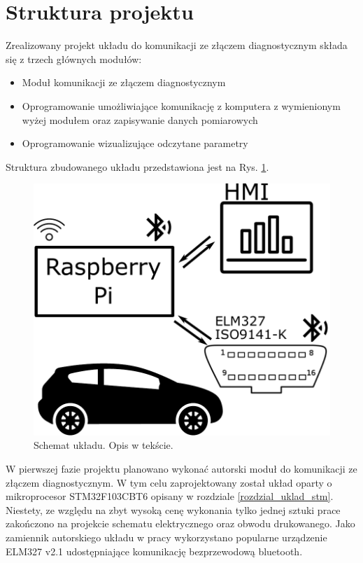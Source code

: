 \documentclass[12pt, twoside]{article} %
\numberwithin{equation}{subsection}
\numberwithin{figure}{section}
\numberwithin{table}{section}
\begin{document}
	\newpage
	
	\section{Struktura projektu}
	\hspace{0.5cm}Zrealizowany projekt układu do komunikacji ze złączem diagnostycznym składa się z trzech głównych modułów:
	
	\begin{itemize}
		\item{Moduł komunikacji ze złączem diagnostycznym}
		\item{Oprogramowanie umożliwiające komunikację z komputera z wymienionym wyżej modułem oraz zapisywanie danych pomiarowych}
		\item{Oprogramowanie wizualizujące odczytane parametry}
	\end{itemize}
	
	Struktura zbudowanego układu przedstawiona jest na Rys. \ref{rys_schemat_ukladu}.
	
		\begin{figure}[ht]
		\centering
		\includegraphics[scale=0.8]{Images/SchematUkladu.pdf}
		\caption{Schemat układu. Opis w tekście.}
		\label{rys_schemat_ukladu}
		\end{figure}
	
	W pierwszej fazie projektu planowano wykonać autorski moduł do komunikacji ze złączem diagnostycznym. W tym celu zaprojektowany został układ oparty o mikroprocesor STM32F103CBT6 opisany w rozdziale \ref{rozdzial_uklad_stm}. Niestety, ze względu na zbyt wysoką cenę wykonania tylko jednej sztuki prace zakończono na projekcie schematu elektrycznego oraz obwodu drukowanego. Jako zamiennik autorskiego układu w pracy wykorzystano popularne urządzenie ELM327 v2.1 udostępniające komunikację bezprzewodową bluetooth. 
	
\end{document}
